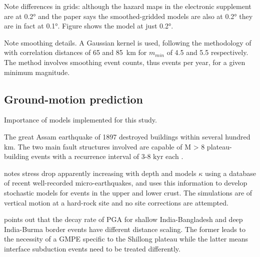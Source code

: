 \documentclass{article}
\begin{document}
Note differences in grids: although the hazard maps in the electronic supplement are at 0.2° and the paper says the smoothed-gridded models are also at 0.2° they are in fact at 0.1°. Figure shows the model at just 0.2°.

Note smoothing details. A Gaussian kernel is used, following the methodology of \cite{frankel1995mapping} with correlation distances of 65 and 85~km for $m_{min}$ of 4.5 and 5.5 respectively. The method involves smoothing event counts, thus events per year, for a given minimum magnitude.

\cite{thingbaijam2011synoptic}

\cite{nath2010earthquake}

\subsection{Ground-motion prediction}
\label{sec:GroundMotion}

Importance of models implemented for this study. 

The great Assam earthquake of 1897 destroyed buildings within several hundred km. The two main fault structures involved are capable of M > 8 plateau-building events with a recurrence interval of 3-8 kyr each \citep{bilham2001plateau}.

\cite{nath2012ground} notes stress drop apparently increasing with depth and models $\kappa$ using a database of recent well-recorded micro-earthquakes, and uses this information to develop stochastic models for events in the upper and lower crust. The simulations are of vertical motion at a hard-rock site and no site corrections are attempted.

\cite{sharma2009ground} points out that the decay rate of PGA for shallow India-Bangladesh and deep India-Burma border events have different distance scaling. The former leads to the necessity of a GMPE specific to the Shillong plateau \cite{nath2012ground} while the latter means interface subduction events need to be treated differently. 
\end{document}
